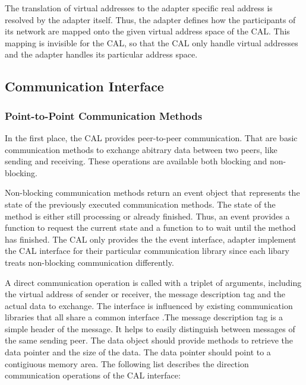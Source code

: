 The translation of virtual addresses to the adapter specific real address
is resolved by the adapter itself. Thus, the adapter defines how the participants
of its network are mapped onto the given virtual address space of the CAL. This
mapping is invisible for the CAL, so that the CAL only handle virtual addresses
and the adapter handles its particular address space.

\subsection{Communication Interface}
\label{sec:cal_comm}
\subsubsection{Point-to-Point Communication Methods}

In the first place, the CAL provides peer-to-peer communication. That
are basic communication methods to exchange abitrary data between two
peers, like sending and receiving.  These operations are available
both blocking and non-blocking.

Non-blocking communication methods return an event object that represents
the state of the previously executed communication methods. The state
of the method is either still processing or already finished. Thus, an
event provides a function to request the current state and a function
to to wait until the method has finished. The CAL only provides the
the event interface, adapter implement the CAL interface for their
particular communication library since each libary treats non-blocking
communication differently.

A direct communication operation is called with a triplet of
arguments, including the virtual address of sender or receiver, the
message description tag and the actual data to exchange.  The
interface is influenced by existing communication libraries that all
share a common interface \cite{ref:boost_mpi, ref:boost_asio,
  ref:zmq}.The message description tag is a simple header of the
message. It helps to easily distinguish between messages of the same
sending peer.  The data object should provide methods to retrieve the
data pointer and the size of the data. The data pointer should point
to a contigiuous memory area. The following list describes the
direction communication operations of the CAL interface:

